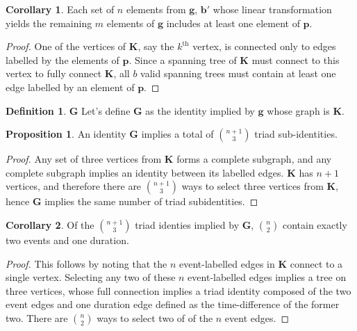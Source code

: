 \documentclass{bmcart}
\theoremstyle{definition}
\newtheorem{definition}{Definition}[section]
\newtheorem{proposition}{Proposition}[section]
\newtheorem{corollary}{Corollary}[proposition]
\begin{document}
\begin{corollary}
Each set of $n$ elements from $\textbf{g}$, $\textbf{b}'$ whose linear
transformation yields the remaining $m$ elements of $\textbf{g}$ includes at
least one element of $\textbf{p}$.
\end{corollary}

\begin{proof}
One of the vertices of $\textbf{K}$, say the $k^{\text{th}}$ vertex, is
connected only to edges labelled by the elements of $\textbf{p}$. Since a
spanning tree of $\textbf{K}$ must connect to this vertex to fully connect
$\textbf{K}$, all $b$ valid spanning trees must contain at least one edge
labelled by an element of $\textbf{p}$.
\end{proof}

\begin{definition}{$\textbf{G}$}
Let's define $\textbf{G}$ as the identity implied by $\textbf{g}$ whose
graph is $\textbf{K}$.
\end{definition}

\begin{proposition}
An identity $\textbf{G}$ implies a total of $\binom{n+1}{3}$ triad
sub-identities.
\end{proposition}

\begin{proof}
Any set of three vertices from $\textbf{K}$ forms a complete subgraph, and any
complete subgraph implies an identity between its labelled edges. $\textbf{K}$
has $n+1$ vertices, and therefore there are $\binom{n+1}{3}$ ways to select
three vertices from $\textbf{K}$, hence $\textbf{G}$ implies the same number of
triad subidentities.
\end{proof}

\begin{corollary}
Of the $\binom{n+1}{3}$ triad identies implied by $\textbf{G}$, $\binom{n}{2}$
contain exactly two events and one duration.
\end{corollary}

\begin{proof}
This follows by noting that the $n$ event-labelled edges in $\textbf{K}$ connect
to a single vertex. Selecting any two of these $n$ event-labelled edges implies
a tree on three vertices, whose full connection implies a triad identity
composed of the two event edges and one duration edge defined as the time-difference of the
former two. There are $\binom{n}{2}$ ways to select two of of the $n$ event
edges.
\end{proof}
\end{document}
